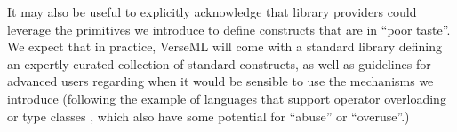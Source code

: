 It may also be useful to explicitly acknowledge that library providers could leverage the primitives we introduce   to define constructs that are in ``poor taste''. We  expect that in practice, VerseML will come with a standard library defining an expertly curated collection of standard constructs, as well as guidelines for advanced users regarding when it would be sensible to use the mechanisms we introduce (following the example of languages that support operator overloading or type classes \cite{Hall:1996:TCH:227699.227700}, which also have some potential for ``abuse'' or ``overuse''.) %

